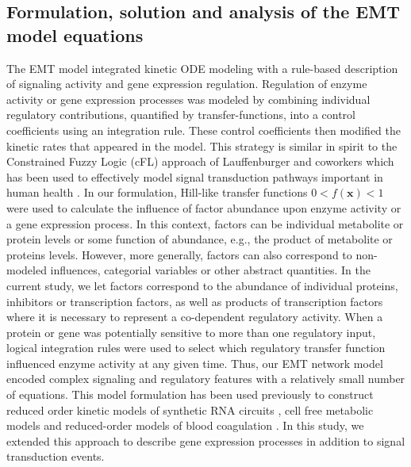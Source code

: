 \documentclass[11pt,letterpaper]{article}
\begin{document}
\subsection*{Formulation, solution and analysis of the EMT model equations}
The EMT model integrated kinetic ODE modeling with a rule-based description of signaling activity and gene expression regulation.
Regulation of enzyme activity or gene expression processes was modeled by combining individual regulatory contributions, quantified by transfer-functions,
into a control coefficients using an integration rule. These control coefficients then modified the kinetic rates that appeared in the model.
This strategy is similar in spirit to the Constrained Fuzzy Logic (cFL) approach of Lauffenburger and coworkers which has been used to effectively model signal transduction pathways important in human health \cite{Morris:2011ys}.
In our formulation, Hill-like transfer functions $0 < f\left(\mathbf{x}\right) < 1$ were used to calculate the influence of factor abundance upon enzyme activity or a gene expression process.
In this context, factors can be individual metabolite or protein levels or some function of abundance, e.g., the product of metabolite or proteins levels.
However, more generally, factors can also correspond to non-modeled influences, categorial variables or other abstract quantities.
In the current study, we let factors correspond to the abundance of individual proteins, inhibitors or transcription factors, as well as products of transcription factors where it is necessary to represent a co-dependent regulatory activity.
When a protein or gene was potentially sensitive to more than one regulatory input, logical integration rules were used to select
which regulatory transfer function influenced enzyme activity at any given time.
Thus, our EMT network model encoded complex signaling and regulatory features with a relatively small number of equations.
This model formulation has been used previously to construct reduced order kinetic models of synthetic RNA circuits \cite{Hu:2015aa},
cell free metabolic models \cite{pr3010138} and reduced-order models of blood coagulation \cite{pr3010178}.
In this study, we extended this approach to describe gene expression processes in addition to signal transduction events.
\end{document}
